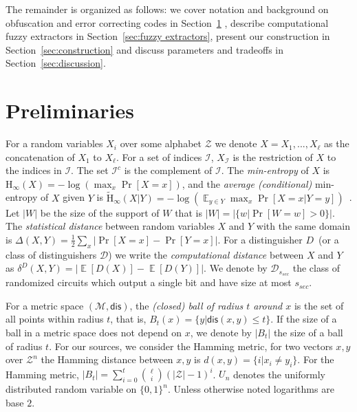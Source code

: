 \documentclass[11pt]{article}
\newcommand{\secref}[1]{\mbox{Section~\ref{#1}}}
\DeclareMathOperator*{\expe}{\mathbb{E}}
\newcommand{\dis}{\ensuremath{\mathsf{dis}}}
\newcommand{\Hoo}{\mathrm{H}_\infty}
\newcommand{\Hav}{\tilde{\mathrm{H}}_\infty}
\newcommand{\authnote}[2]{{\textcolor{red}{\textsf{#1 notes: }\textcolor{blue}{ #2}}\marginpar{\textcolor{red}{\textbf{!!!!!}}}}}
\newcommand{\authnote}[2]{}
\newcommand{\bnote}[1]{{\authnote{Ben}{#1}}}
\begin{document}
The remainder is organized as follows: we cover notation and background on obfuscation and error correcting codes in \secref{sec:preliminaries} , describe computational fuzzy extractors in \secref{sec:fuzzy extractors}, present our construction in \secref{sec:construction} and discuss parameters and tradeoffs in \secref{sec:discussion}.

\section{Preliminaries}
\label{sec:preliminaries}
For a random variables $X_i$ over some alphabet $\mathcal{Z}$ we denote $X = X_1,..., X_\ell$ as the concatenation of $X_1$ to $X_\ell$.  For a set of indices $\mathcal{I}$,  $X_{\mathcal{I}}$ is the restriction of $X$ to the indices in $\mathcal{I}$.  The set $\mathcal{I}^c$ is the complement of $\mathcal{I}$.  The {\em min-entropy} of $X$ is $\Hoo(X) = -\log(\max_x \Pr[X=x])$, 
and the {\em average (conditional)} min-entropy of $X$ given $Y$ is  $\Hav(X|Y) = -\log(\expe_{y\in Y} \max_{x} \Pr[X=x|Y=y])$~\cite[Section 2.4]{DBLP:journals/siamcomp/DodisORS08}.   Let $|W|$ be the size of the support of $W$ that is $|W| = |\{w | \Pr[W=w]>0\}|$.
The {\em statistical distance} between random variables $X$ and $Y$ with the same domain is $\Delta(X,Y) = \frac12 \sum_x |\Pr[X=x] - \Pr[Y=x]|$. 
For a distinguisher $D$~(or a class of distinguishers $\mathcal{D}$) we write the \emph{computational distance} between $X$ and $Y$ as $\delta^D(X,Y) = \left| \expe[D(X)]-\expe[D(Y)]\right |$.  We denote by $\mathcal{D}_{s_{sec}}$ the class of randomized circuits which output a single bit and have size at most $s_{sec}$.

For a metric space $(\mathcal{M}, \dis)$, the \emph{(closed) ball of radius $t$ around $x$} is the set of all points within radius $t$, that is, $B_t(x) = \{y| \dis(x, y)\leq t\}$.  If the size of a ball in a metric space does not depend on $x$, we denote by $|B_t|$ the size of a ball of radius $t$.  For our sources, we consider the Hamming metric, for two vectors $x, y$ over $\mathcal{Z}^n$ the Hamming distance between $x,y$ is $d(x,y) = \{i | x_i \neq y_i\}$.  For the Hamming metric, $|B_t| = \sum_{i=0}^t {\ell \choose i} (|\mathcal{Z}|-1)^i $.  $U_n$ denotes the uniformly  distributed random variable on $\{0,1\}^n$.  Unless otherwise noted logarithms are base $2$.
\end{document}
